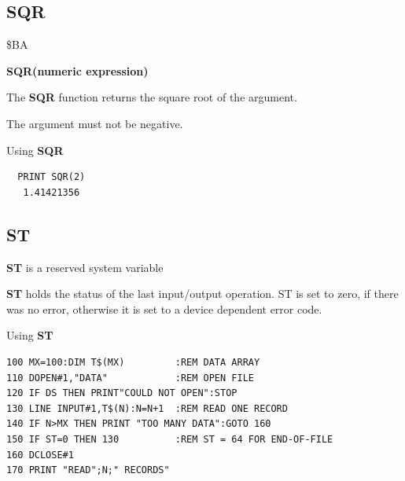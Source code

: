 \subsection{SQR}
\begin{description}[leftmargin=2cm,style=nextline]
\item [Token:] \$BA
\item [Format:] {\bf SQR(numeric expression)}
\item [Usage:] The {\bf SQR} function returns the square root
               of the argument.

\item [Remarks:] The argument must not be negative.
\item [Example:] Using {\bf SQR}
\begin{tcolorbox}[colback=black,coltext=white]
\verbatimfont{\codefont}
\begin{verbatim}
  PRINT SQR(2)
   1.41421356
\end{verbatim}
\end{tcolorbox}
\end{description}


\newpage
\subsection{ST}
\begin{description}[leftmargin=2cm,style=nextline]
\item [Format:] {\bf ST} is a reserved system variable
\item [Usage:]  {\bf ST} holds the status of the last input/output operation.
                ST is set to zero, if there was no error, otherwise
                it is set to a device dependent error code.

\item [Example:] Using {\bf ST}
\begin{tcolorbox}[colback=black,coltext=white]
\verbatimfont{\codefont}
\begin{verbatim}
100 MX=100:DIM T$(MX)         :REM DATA ARRAY
110 DOPEN#1,"DATA"            :REM OPEN FILE
120 IF DS THEN PRINT"COULD NOT OPEN":STOP
130 LINE INPUT#1,T$(N):N=N+1  :REM READ ONE RECORD
140 IF N>MX THEN PRINT "TOO MANY DATA":GOTO 160
150 IF ST=0 THEN 130          :REM ST = 64 FOR END-OF-FILE
160 DCLOSE#1
170 PRINT "READ";N;" RECORDS"
\end{verbatim}
\end{tcolorbox}
\end{description}

